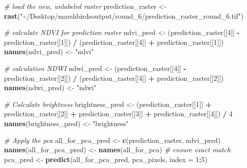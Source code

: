 \documentclass[
]{article}
\newenvironment{Shaded}{\begin{snugshade}}{\end{snugshade}}
\newcommand{\AttributeTok}[1]{\textcolor[rgb]{0.13,0.29,0.53}{#1}}
\newcommand{\CommentTok}[1]{\textcolor[rgb]{0.56,0.35,0.01}{\textit{#1}}}
\newcommand{\DecValTok}[1]{\textcolor[rgb]{0.00,0.00,0.81}{#1}}
\newcommand{\FunctionTok}[1]{\textcolor[rgb]{0.13,0.29,0.53}{\textbf{#1}}}
\newcommand{\NormalTok}[1]{#1}
\newcommand{\OtherTok}[1]{\textcolor[rgb]{0.56,0.35,0.01}{#1}}
\newcommand{\SpecialCharTok}[1]{\textcolor[rgb]{0.81,0.36,0.00}{\textbf{#1}}}
\newcommand{\StringTok}[1]{\textcolor[rgb]{0.31,0.60,0.02}{#1}}
\begin{document}
\begin{Shaded}
\begin{Highlighting}[]
\CommentTok{\# load the new, unlabeled raster}
\NormalTok{prediction\_raster }\OtherTok{\textless{}{-}} \FunctionTok{rast}\NormalTok{(}\StringTok{"\textasciitilde{}/Desktop/marshbirdsoutput/round\_6/prediction\_raster\_round\_6.tif"}\NormalTok{)}

\CommentTok{\# calculate NDVI for prediction raster}
\NormalTok{ndvi\_pred }\OtherTok{\textless{}{-}}\NormalTok{ (prediction\_raster[[}\DecValTok{4}\NormalTok{]] }\SpecialCharTok{{-}}\NormalTok{ prediction\_raster[[}\DecValTok{1}\NormalTok{]]) }\SpecialCharTok{/} 
\NormalTok{  (prediction\_raster[[}\DecValTok{4}\NormalTok{]] }\SpecialCharTok{+}\NormalTok{ prediction\_raster[[}\DecValTok{1}\NormalTok{]])}
\FunctionTok{names}\NormalTok{(ndvi\_pred) }\OtherTok{\textless{}{-}} \StringTok{"ndvi"}

\CommentTok{\# calculation NDWI}
\NormalTok{ndwi\_pred }\OtherTok{\textless{}{-}}\NormalTok{ (prediction\_raster[[}\DecValTok{4}\NormalTok{]] }\SpecialCharTok{{-}}\NormalTok{ prediction\_raster[[}\DecValTok{2}\NormalTok{]]) }\SpecialCharTok{/} 
\NormalTok{  (prediction\_raster[[}\DecValTok{4}\NormalTok{]] }\SpecialCharTok{+}\NormalTok{ prediction\_raster[[}\DecValTok{2}\NormalTok{]])}
\FunctionTok{names}\NormalTok{(ndwi\_pred) }\OtherTok{\textless{}{-}} \StringTok{"ndwi"}

\CommentTok{\# Calculate brightness}
\NormalTok{brightness\_pred }\OtherTok{\textless{}{-}}\NormalTok{ (prediction\_raster[[}\DecValTok{1}\NormalTok{]] }\SpecialCharTok{+}\NormalTok{ prediction\_raster[[}\DecValTok{2}\NormalTok{]] }\SpecialCharTok{+} 
\NormalTok{                      prediction\_raster[[}\DecValTok{3}\NormalTok{]] }\SpecialCharTok{+}\NormalTok{ prediction\_raster[[}\DecValTok{4}\NormalTok{]]) }\SpecialCharTok{/} \DecValTok{4}
\FunctionTok{names}\NormalTok{(brightness\_pred) }\OtherTok{\textless{}{-}} \StringTok{"brightness"}

\CommentTok{\# Apply the pca}
\NormalTok{all\_for\_pca\_pred }\OtherTok{\textless{}{-}} \FunctionTok{c}\NormalTok{(prediction\_raster, ndvi\_pred)}
\FunctionTok{names}\NormalTok{(all\_for\_pca\_pred) }\OtherTok{\textless{}{-}} \FunctionTok{names}\NormalTok{(all\_for\_pca)  }\CommentTok{\# ensure exact match}
\NormalTok{pca\_pred }\OtherTok{\textless{}{-}} \FunctionTok{predict}\NormalTok{(all\_for\_pca\_pred, pca\_pixels, }\AttributeTok{index =} \DecValTok{1}\SpecialCharTok{:}\DecValTok{5}\NormalTok{)}
\end{Highlighting}
\end{Shaded}
\end{document}
